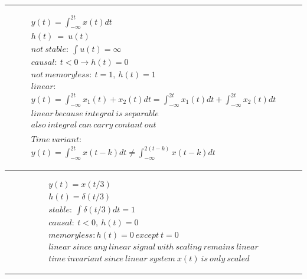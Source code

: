 \documentclass{article}[12pt]
\begin{document}
\hrule
\begin{equation}
	\begin{gathered}
			y( t) =\int _{-\infty }^{2t} x( t) dt\\
			h( t) \ =\ u( t)\\
			not\ stable:\ \int u( t) =\infty \\
			causal:\ t< 0\rightarrow h( t) =0\\
			not\ memoryless:\ t=1,\ h( t) =1\\
			linear:\ \\
			y( t) =\int _{-\infty }^{2t} x_{1}( t) +x_{2}( t) dt=\int _{-\infty }^{2t} x_{1}( t) dt+\int _{-\infty }^{2t} x_{2}( t) dt\\
			linear\ because\ integral\ is\ separable\\
			also\ integral\ can\ carry\ contant\ out\ \\
			\\
			Time\ variant:\ \\
			y( t) =\int _{-\infty }^{2t} x( t-k) dt\neq \int _{-\infty }^{2( t-k)} x( t-k) dt
	\end{gathered}
\end{equation}
\hrule
\begin{equation}
	\begin{gathered}
			y( t) =x( t/3)\\
			h( t) =\delta ( t/3)\\
			stable:\ \int \delta ( t/3) dt=1\\
			causal:\ t< 0,\ h( t) =0\\
			memoryless:h( t) =0\ except\ t=0\\
			linear\ since\ any\ linear\ signal\ with\ scaling\ remains\ linear\\
			time\ invariant\ since\ linear\ system\ x( t) \ is\ only\ scaled
	\end{gathered}
\end{equation}
\hrule
\end{document}
